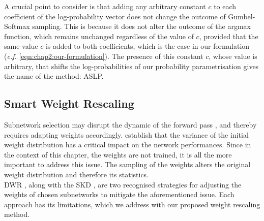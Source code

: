 A crucial point to consider is that adding any arbitrary constant $c$ to each
coefficient of the log-probability vector does not change the outcome of
Gumbel-Softmax sampling. This is because it does not alter the outcome of the
argmax function, which remains unchanged regardless of the value of $c$,
provided that the same value $c$ is added to both coefficients, which is the case
in our formulation (\emph{c.f.} \cref{eqn:chap2:our-formulation}). The
presence of this constant $c$, whose value is arbitrary, that shifts the
log-probabilities of our probability parametrisation gives the name of the
method: \acl{ASLP}.\\



\subsection{Smart Weight Rescaling}
\label{sec:chap2:smart-rescale}
Subnetwork selection may disrupt the dynamic of the forward pass
\cite{DBLP:conf/iccv/HeZRS15,DBLP:conf/cvpr/RamanujanWKFR20}, and thereby
requires adapting weights accordingly. \cite{DBLP:conf/iccv/HeZRS15} establish
that the variance of the initial weight distribution has a critical impact on
the network performances. Since in the context of this chapter, the weights are
not trained, it is all the more important to address this issue. The sampling of
the weights alters the original weight distribution and therefore its
statistics.\\

\acf{DWR} \cite{DBLP:conf/nips/ZhouLLY19}, along with the \ac{SKD}
\cite{DBLP:conf/cvpr/RamanujanWKFR20}, are two recognised strategies for
adjusting the weights of chosen subnetworks to mitigate the aforementioned
issue. Each approach has its limitations, which we address with our proposed
weight rescaling method.\\


